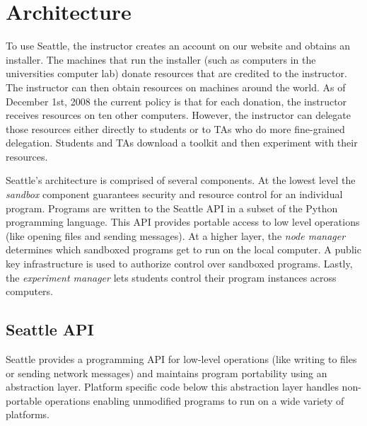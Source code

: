 \section{Architecture}
\label{sec-architecture}

To use Seattle, the instructor creates an account on our website and obtains
an installer.   The machines that run the installer (such as computers in 
the universities computer lab) donate resources that are credited to the 
instructor.   The instructor can then obtain resources on machines around the 
world.   As of December 1st, 2008 the current policy is that for each donation,
the instructor receives resources on ten other computers.   However, the 
instructor can delegate those resources either directly to students or
to TAs who do more fine-grained delegation.   Students and TAs download
a toolkit and then experiment with their resources.

Seattle's architecture is comprised of several components. At the
lowest level the \emph{sandbox} component guarantees security and
resource control for an individual program. Programs are written to
the Seattle API in a subset of the Python programming language. This
API provides portable access to low level operations (like opening
files and sending messages). At a higher layer, the \emph{node
  manager} determines which sandboxed programs get to run on the local
computer. A public key infrastructure is used to authorize control
over sandboxed programs. Lastly, the \emph{experiment manager} lets
students control their program instances across computers.

\subsection{Seattle API}
\label{sec-API}

Seattle provides a programming API for low-level operations (like
writing to files or sending network messages) and maintains program
portability using an abstraction layer. Platform specific code below
this abstraction layer handles non-portable operations enabling
unmodified programs to run on a wide variety of
platforms. %


